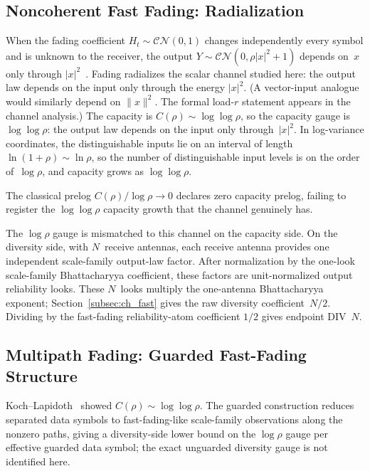 \documentclass[lettersize,onecolumn]{IEEEtran}
\newcommand{\snr}{\rho}
\begin{document}
\subsection{Noncoherent Fast Fading: Radialization}
\label{subsec:int_fast}

When the fading coefficient $H_t\sim\mathcal{CN}(0,1)$ changes
independently every symbol and is unknown to the receiver, the
output $Y \sim \mathcal{CN}(0,\snr|x|^2+1)$ depends on~$x$ only
through $|x|^2$~\cite{LapidothMoser2003}. Fading radializes the
scalar channel studied here: the output law depends on the input
only through the energy $|x|^2$. (A vector-input analogue would
similarly depend on $\|x\|^2$. The formal load-$r$ statement appears in the channel analysis.) The
capacity is $C(\snr)\sim\log\log\snr$, so the capacity gauge is
$\log\log\snr$: the output law depends on the input only
through~$|x|^2$. In log-variance coordinates, the distinguishable
inputs lie on an interval of length $\ln(1+\snr) \sim \ln\snr$, so
the number of distinguishable input levels is on the order
of~$\log\snr$, and capacity grows as $\log\log\snr$.

The classical prelog $C(\snr)/\log\snr \to 0$ declares zero capacity
prelog, failing to register the $\log\log\snr$ capacity growth that
the channel genuinely has.

The $\log\snr$ gauge is mismatched to this channel on the capacity
side. On the diversity side, with $N$~receive antennas, each receive antenna provides one independent scale-family
output-law factor. After normalization by the one-look scale-family
Bhattacharyya coefficient, these factors are unit-normalized output
reliability looks. These $N$~looks multiply the one-antenna
Bhattacharyya exponent;
Section~\ref{subsec:ch_fast} gives the raw diversity coefficient~$N/2$.
Dividing by the fast-fading reliability-atom coefficient $1/2$
gives endpoint DIV~$N$.

\subsection{Multipath Fading: Guarded Fast-Fading Structure}
\label{subsec:int_multipath}

Koch--Lapidoth~\cite{KochLapidoth2009} showed
$C(\snr)\sim\log\log\snr$. The guarded construction reduces separated
data symbols to fast-fading-like scale-family observations along the
nonzero paths, giving a diversity-side lower bound on the $\log\snr$
gauge per effective guarded data symbol; the exact unguarded diversity
gauge is not identified here.
\end{document}
